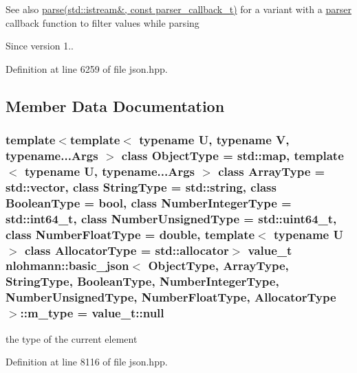 \begin{DoxySeeAlso}{See also}
\hyperlink{classnlohmann_1_1basic__json_a0923f9749409345a21f8cb15ee95fc0d}{parse(std\+::istream\&, const parser\+\_\+callback\+\_\+t)} for a variant with a \hyperlink{classnlohmann_1_1basic__json_1_1parser}{parser} callback function to filter values while parsing
\end{DoxySeeAlso}
\begin{DoxySince}{Since}
version 1.. 
\end{DoxySince}


Definition at line 6259 of file json.\+hpp.



\subsection{Member Data Documentation}
\hypertarget{classnlohmann_1_1basic__json_a7a1d275f5420bca10dff52a774d9a950}{}
\subsubsection[{m\+\_\+type}]{\setlength{\rightskip}{0pt plus 5cm}template$<$template$<$ typename U, typename V, typename...\+Args $>$ class Object\+Type = std\+::map, template$<$ typename U, typename...\+Args $>$ class Array\+Type = std\+::vector, class String\+Type  = std\+::string, class Boolean\+Type  = bool, class Number\+Integer\+Type  = std\+::int64\+\_\+t, class Number\+Unsigned\+Type  = std\+::uint64\+\_\+t, class Number\+Float\+Type  = double, template$<$ typename U $>$ class Allocator\+Type = std\+::allocator$>$ {\bf value\+\_\+t} {\bf nlohmann\+::basic\+\_\+json}$<$ Object\+Type, Array\+Type, String\+Type, Boolean\+Type, Number\+Integer\+Type, Number\+Unsigned\+Type, Number\+Float\+Type, Allocator\+Type $>$\+::m\+\_\+type = {\bf value\+\_\+t\+::null}\hspace{0.3cm}{\ttfamily [private]}}\label{classnlohmann_1_1basic__json_a7a1d275f5420bca10dff52a774d9a950}


the type of the current element 



Definition at line 8116 of file json.\+hpp.

\hypertarget{classnlohmann_1_1basic__json_a7d014eac0fb6ffaeceee0171ffa0df45}{}
